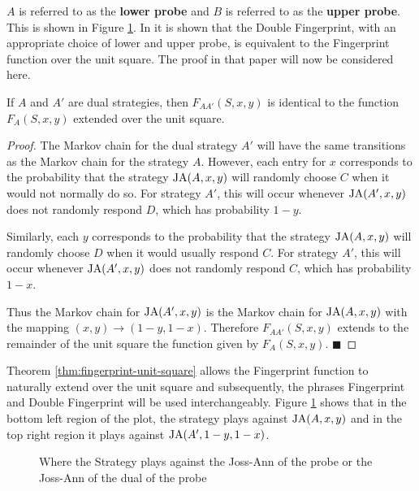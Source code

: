 $A$ is referred to as the \textbf{lower probe} and $B$ is referred to as the \textbf{upper probe}.
This is shown in Figure \ref{fig:DualProbe}.
In \cite{Ashlock2004} it is shown that the Double Fingerprint, with an appropriate choice of lower and upper probe, is equivalent to the Fingerprint function over the unit square.
The proof in that paper will now be considered here.

\begin{theorem}\label{thm:fingerprint-unit-square}
If $A$ and $A'$ are dual strategies, then $F_{AA'}(S, x, y)$ is identical to the function $F_A(S, x, y)$ extended over the unit square.
\end{theorem}


\begin{proof}\label{prf:fingerprint-unit-square}
The Markov chain for the dual strategy $A'$ will have the same transitions as the Markov chain for the strategy $A$.
However, each entry for $x$ corresponds to the probability that the strategy $\text{JA}(A, x, y)$ will randomly choose $C$ when it would not normally do so.
For strategy $A'$, this will occur whenever $\text{JA}(A', x, y)$ does not randomly respond $D$, which has probability $1 - y$.

Similarly, each $y$ corresponds to the probability that the strategy $\text{JA}(A, x, y)$ will randomly choose $D$ when it would usually respond $C$.
For strategy $A'$, this will occur whenever $\text{JA}(A', x, y)$ does not randomly respond $C$, which has probability $1 - x$.

Thus the Markov chain for $\text{JA}(A', x, y)$ is the Markov chain for $\text{JA}(A, x, y)$ with the mapping $(x, y) \rightarrow (1-y, 1-x)$.
Therefore $F_{AA'}(S, x, y)$ extends to the remainder of the unit square the function given by $F_A(S, x, y)$. $\blacksquare$
\end{proof}

Theorem \ref{thm:fingerprint-unit-square} allows the Fingerprint function to naturally extend over the unit square and subsequently, the phrases Fingerprint and Double Fingerprint will be used interchangeably.
Figure \ref{fig:DualProbe} shows that in the \textcolor{sol-violet}{bottom left} region of the plot, the strategy plays against $\text{JA}(A, x, y)$ and in the \textcolor{sol-cyan}{top right} region it plays against $\text{JA}(A', 1-y, 1-x)$.

\begin{figure}[!hbtp]
    \begin{center}
        
        \caption{Where the Strategy plays against the Joss-Ann of the probe or the Joss-Ann of the dual of the probe}\label{fig:DualProbe}
    \end{center}
\end{figure}

